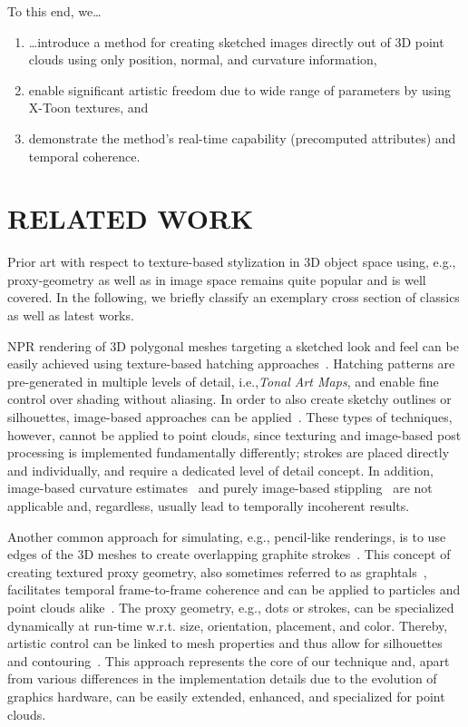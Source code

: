 \documentclass[a4paper,twoside]{article}
\newcommand{\eg}{e.g.,\xspace}
\newcommand{\ie}{i.e.,\xspace}
\begin{document}
To this end, we\ldots
%
\begin{enumerate}
    \item \ldots{}introduce a method for creating sketched images directly out of 3D point clouds using only position, normal, and curvature information,
    \item enable significant artistic freedom due to wide range of parameters by using X-Toon textures, and
    \item demonstrate the method's real-time capability (precomputed attributes) and temporal coherence.
\end{enumerate}




\section{\texorpdfstring{\uppercase{Related Work}}{Related Work}}
\label{PCNPR:Sec:RelatedWork}
%
Prior art with respect to texture-based stylization in 3D object space using, \eg proxy-geometry as well as in image space remains quite popular and is well covered.
In the following, we briefly classify an exemplary cross section of classics as well as latest works.

\Ac{NPR} rendering of 3D polygonal meshes targeting a sketched look and feel can be easily achieved using texture-based hatching approaches~\cite{Praun2001,Webb2002}.
Hatching patterns are pre-generated in multiple levels of detail, \ie \emph{Tonal Art Maps}, and enable fine control over shading without aliasing.
In order to also create sketchy outlines or silhouettes, image-based approaches can be applied~\cite{Nienhaus2003,Zakaria2004}.
These types of techniques, however, cannot be applied to point clouds, since texturing and image-based post processing is implemented fundamentally differently; strokes are placed directly and individually, and require a dedicated level of detail concept.
In addition, image-based curvature estimates~\cite{Kim2008} and purely image-based stippling~\cite{Awano2010} are not applicable and, regardless, usually lead to temporally incoherent results.

Another common approach for simulating, \eg pencil-like renderings, is to use edges of the 3D meshes to create overlapping graphite strokes~\cite{Sousa1999}.
This concept of creating textured proxy geometry, also sometimes referred to as graphtals~\cite{Smith1984}, facilitates temporal frame-to-frame coherence and can be applied to particles and point clouds alike~\cite{Kaplan2000,Markosian2000}.
The proxy geometry, \eg dots or strokes, can be specialized dynamically at run-time w.r.t. size, orientation, placement, and color.
Thereby, artistic control can be linked to mesh properties and thus allow for silhouettes and contouring~\cite{Grabli2004}.
This approach represents the core of our technique and, apart from various differences in the implementation details due to the evolution of graphics hardware, can be easily extended, enhanced, and specialized for point clouds.
\end{document}
